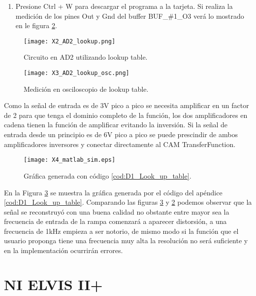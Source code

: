 \begin{enumerate}
		\item Presione Ctrl + W para descargar el programa a la tarjeta. Si realiza la medición de los pines Out y Gnd del buffer BUF\_{}\#{}1\_{}O3 verá lo mostrado en le figura \ref{fig:X3_AD2_lookup_osc}.
	\end{enumerate}
	
	\begin{figure}[!ht]
		\caption{Circuito en AD2 utilizando lookup table.}
		\label{fig:X2_AD2_lookup}
		\centering
		\texttt{[image: X2\_AD2\_lookup.png]}
	\end{figure}	
	
	\begin{figure}[!ht]
		\caption{Medición en osciloscopio de lookup table.}
		\label{fig:X3_AD2_lookup_osc}
		\centering
		\texttt{[image: X3\_AD2\_lookup\_osc.png]}
	\end{figure}

	Como la señal de entrada es de 3V pico a pico se necesita amplificar en un factor de 2 para que tenga el dominio completo de la función, los dos amplificadores en cadena tienen la función de amplificar evitando la inversión. Si la señal de entrada desde un principio es de 6V pico a pico se puede prescindir de ambos amplificadores inversores y conectar directamente al CAM TransferFunction.

	\begin{figure}[!ht]
		\caption{Gráfica generada con código \ref{cod:D1_Look_up_table}.} 
		\label{fig:X4_matlab_sim}
		\centering
		\texttt{[image: X4\_matlab\_sim.eps]}
	\end{figure}

	En la Figura \ref{fig:X4_matlab_sim} se muestra la gráfica generada por el código del apéndice \ref{cod:D1_Look_up_table}. Comparando las figuras \ref{fig:X4_matlab_sim} y \ref{fig:X3_AD2_lookup_osc} podemos observar que la señal se reconstruyó con una buena calidad no obstante entre mayor sea la frecuencia de entrada de la rampa comenzará a aparecer distorsión, a una frecuencia de 1kHz empieza a ser notorio, de mismo modo si la función que el usuario proponga tiene una frecuencia muy alta la resolución no será suficiente y en la implementación ocurrirán errores.
	
	
	
	
	\vspace{5cm}
	\section{NI ELVIS II+}

